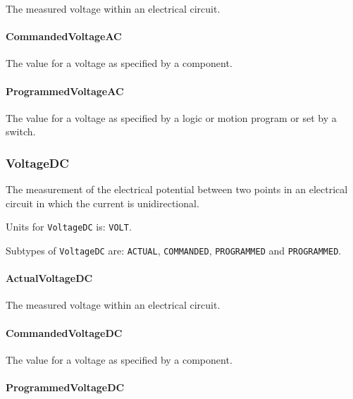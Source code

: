 The measured voltage within an electrical circuit.


\paragraph{CommandedVoltageAC}\mbox{}
\label{sec:CommandedVoltageAC}



The value for a voltage as specified by a  component.


\paragraph{ProgrammedVoltageAC}\mbox{}
\label{sec:ProgrammedVoltageAC}



The value for a voltage as specified by a logic or motion program or set by a switch.


\subsubsection{VoltageDC}
\label{sec:VoltageDC}



The measurement of the electrical potential between two points in an electrical circuit in which the current is unidirectional.


Units for \texttt{VoltageDC} is: \texttt{VOLT}.


Subtypes of \texttt{VoltageDC} are: \texttt{ACTUAL}, \texttt{COMMANDED}, \texttt{PROGRAMMED} and \texttt{PROGRAMMED}. 
\FloatBarrier

\paragraph{ActualVoltageDC}\mbox{}
\label{sec:ActualVoltageDC}



The measured voltage within an electrical circuit.


\paragraph{CommandedVoltageDC}\mbox{}
\label{sec:CommandedVoltageDC}



The value for a voltage as specified by a  component.


\paragraph{ProgrammedVoltageDC}\mbox{}
\label{sec:ProgrammedVoltageDC}



